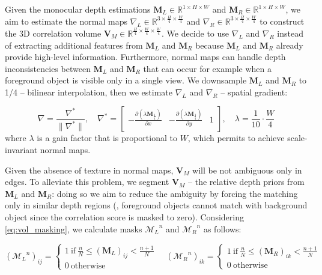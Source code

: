 \documentclass[10pt,twocolumn,letterpaper]{article}
\begin{document}
Given the monocular depth estimations $\textbf{M}_L \in \mathbb{R}^{1 \times H \times W}$ and $\textbf{M}_R \in \mathbb{R}^{1 \times H \times W}$, we aim to estimate the normal maps $\nabla_L \in \mathbb{R}^{3 \times \frac{H}{4} \times \frac{W}{4}}$ and $\nabla_R \in \mathbb{R}^{3 \times \frac{H}{4} \times \frac{W}{4}}$ to construct the 3D correlation volume $\mathbf{V}_M \in \mathbb{R}^{\frac{H}{4} \times \frac{W}{4} \times \frac{W}{4}}$.
We decide to use $\nabla_L$ and $\nabla_R$ instead of extracting additional features from $\textbf{M}_L$ and $\textbf{M}_R$ because $\textbf{M}_L$ and $\textbf{M}_R$ already provide high-level information.
Furthermore, normal maps can handle depth inconsistencies between $\textbf{M}_L$ and $\textbf{M}_R$ that can occur for example when a foreground object is visible only in a single view.
We downsample $\textbf{M}_L$ and $\textbf{M}_R$ to 1/4  -- bilinear interpolation, then we estimate $\nabla_L$ and $\nabla_R$  -- spatial gradient:

\small\begin{equation}
    \nabla = \frac{\nabla^*}{\lVert \nabla^* \rVert}, \quad \nabla^* = \begin{bmatrix}
        -\frac{\partial \left(\lambda\mathbf{M}_\frac{1}{4}\right)}{\partial x} & -\frac{\partial \left(\lambda\mathbf{M}_\frac{1}{4}\right)}{\partial y} & 1 \\
    \end{bmatrix}, \quad \lambda = \frac{1}{10}\cdot\frac{W}{4}
    \label{eq:normal_estimation}
\end{equation}\normalsize
where $\lambda$ is a gain factor that is proportional to $W$, which permits to achieve scale-invariant normal maps.

Given the absence of texture in normal maps, $\textbf{V}_M$ will be not ambiguous only in edges.
To alleviate this problem, we segment $\textbf{V}_M$  -- the relative depth priors from $\textbf{M}_L$ and $\textbf{M}_R$: doing so we aim to reduce the ambiguity by forcing the matching only in similar depth regions (\eg, foreground objects cannot match with background object since the correlation score is masked to zero).
Considering \cref{eq:vol_masking}, we calculate masks ${\mathcal{M}_L}^n$ and ${\mathcal{M}_R}^n$ as follows:

\small\begin{equation}
    ({\mathcal{M}_L}^n)_{ij} = \begin{cases}
        1\ \text{if}\ \frac{n}{N} \leq (\mathbf{M}_L)_{ij} < \frac{n+1}{N}\\
        0\ \text{otherwise}
    \end{cases} \quad ({\mathcal{M}_R}^n)_{ik} = \begin{cases}
        1\ \text{if}\ \frac{n}{N} \leq (\mathbf{M}_R)_{ik} < \frac{n+1}{N}\\
        0\ \text{otherwise}
    \end{cases}
    \label{eq:mask}
\end{equation}\normalsize
\end{document}
